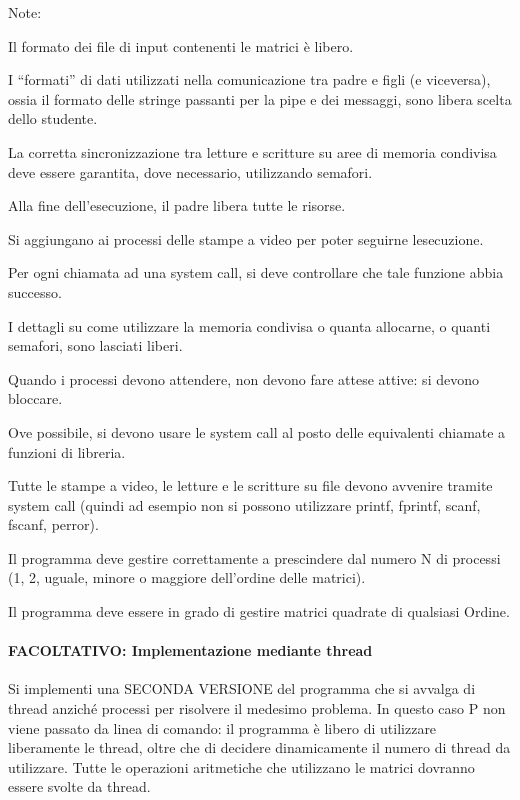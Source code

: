 Note\+:
\begin{DoxyItemize}
\item Il formato dei file di input contenenti le matrici è libero.
\item I “formati” di dati utilizzati nella comunicazione tra padre e figli (e viceversa), ossia il formato delle stringe passanti per la pipe e dei messaggi, sono libera scelta dello studente.
\item La corretta sincronizzazione tra letture e scritture su aree di memoria condivisa deve essere garantita, dove necessario, utilizzando semafori.
\item Alla fine dell’esecuzione, il padre libera tutte le risorse.
\item Si aggiungano ai processi delle stampe a video per poter seguirne l\textquotesingle{}esecuzione.
\item Per ogni chiamata ad una system call, si deve controllare che tale funzione abbia successo.
\item I dettagli su come utilizzare la memoria condivisa o quanta allocarne, o quanti semafori, sono lasciati liberi.
\item Quando i processi devono attendere, non devono fare attese attive\+: si devono bloccare.
\item Ove possibile, si devono usare le system call al posto delle equivalenti chiamate a funzioni di libreria.
\item Tutte le stampe a video, le letture e le scritture su file devono avvenire tramite system call (quindi ad esempio non si possono utilizzare printf, fprintf, scanf, fscanf, perror).
\item Il programma deve gestire correttamente a prescindere dal numero N di processi (1, 2, uguale, minore o maggiore dell’ordine delle matrici).
\item Il programma deve essere in grado di gestire matrici quadrate di qualsiasi Ordine.
\end{DoxyItemize}

\paragraph*{F\+A\+C\+O\+L\+T\+A\+T\+I\+VO\+: Implementazione mediante thread}

Si implementi una S\+E\+C\+O\+N\+DA V\+E\+R\+S\+I\+O\+NE del programma che si avvalga di thread anziché processi per risolvere il medesimo problema. In questo caso P non viene passato da linea di comando\+: il programma è libero di utilizzare liberamente le thread, oltre che di decidere dinamicamente il numero di thread da utilizzare. Tutte le operazioni aritmetiche che utilizzano le matrici dovranno essere svolte da thread.

